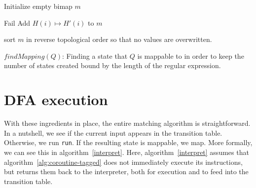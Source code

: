 \documentclass[11pt,a4paper,twoside,openright]{Thesis}
\theoremstyle{definition}
\begin{document}
\begin{algorithm*}[htpb]
\begin{algorithmic}[1]


	\State Initialize empty bimap $m$ 



				\State Fail
			\Else
				\State Add $H(i) \mapsto H'(i)$ to $m$
			\EndIf
		\EndFor
    \EndFor
\EndFor
{}

	\State sort $m$ in reverse topological order so that no values are overwritten.

  \caption[$findMapping(Q)$]{\label{findmapping}$findMapping(Q)$: Finding a state that $Q$ is
mappable to in order to keep the number of states created bound by the length
of the regular expression.}
\end{algorithmic}
\end{algorithm*}

\section{DFA execution}
With these ingredients in place, the entire matching algorithm is
straightforward.  In a nutshell, we see if the current input appears
in the transition table. Otherwise, we run \texttt{run}. If the
resulting state is mappable, we map.  More formally, we can see
this in algorithm~\ref{interpret}. Here, algorithm~\ref{interpret}
assumes that algorithm~\ref{alg:coroutine-tagged} does not immediately execute
its instructions, but returns them back to the interpreter, both for
execution and to feed into the transition table.
\end{document}
